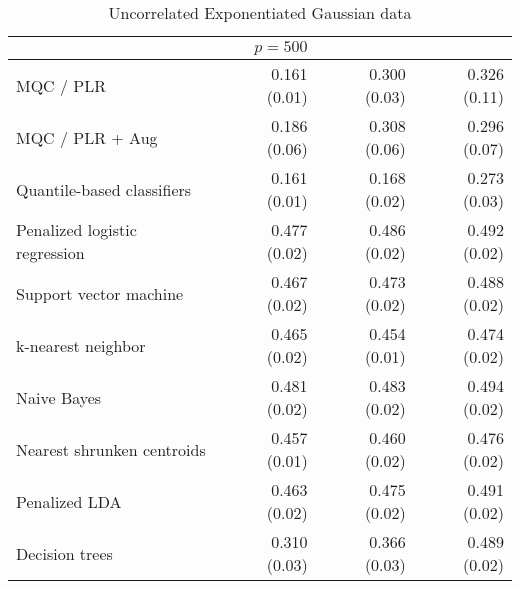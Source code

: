 \begin{table}[p]
\begin{adjustbox}{max size={\textwidth}{10cm}}
\begin{tabular}{l@{\extracolsep{15mm}}rrr}
      \hline
      & $p = 500$ \\
      \hline

      MQC / PLR & 0.161 (0.01) & 0.300 (0.03) & 0.326 (0.11) \\ 
      MQC / PLR + Aug & 0.186 (0.06) & 0.308 (0.06) & 0.296 (0.07) \\ 
      Quantile-based classifiers & 0.161 (0.01) & 0.168 (0.02) & 0.273 (0.03) \\ 
      Penalized logistic regression & 0.477 (0.02) & 0.486 (0.02) & 0.492 (0.02) \\ 
      Support vector machine & 0.467 (0.02) & 0.473 (0.02) & 0.488 (0.02) \\ 
      k-nearest neighbor & 0.465 (0.02) & 0.454 (0.01) & 0.474 (0.02) \\ 
      Naive Bayes & 0.481 (0.02) & 0.483 (0.02) & 0.494 (0.02) \\ 
      Nearest shrunken centroids & 0.457 (0.01) & 0.460 (0.02) & 0.476 (0.02) \\ 
      Penalized LDA & 0.463 (0.02) & 0.475 (0.02) & 0.491 (0.02) \\ 
      Decision trees & 0.310 (0.03) & 0.366 (0.03) & 0.489 (0.02) \\ 
      \hline
      
    \end{tabular}
  \end{adjustbox}
  \caption{Uncorrelated Exponentiated Gaussian data}
\end{table}


